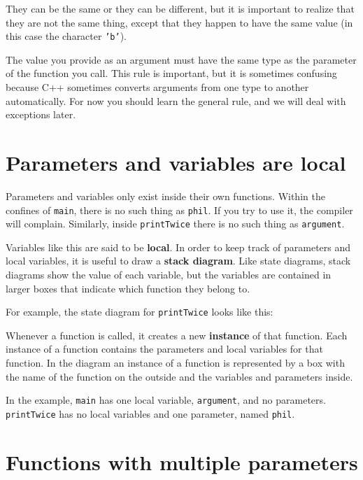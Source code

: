 They can be the same or they can be different, but it is important
to realize that they are not the same thing, except that they happen
to have the same value (in this case the character {\tt 'b'}).

The value you provide as an argument must have the same type as
the parameter of the function you call.  This rule is
important, but it is sometimes confusing because C++ sometimes
converts arguments from one type to another automatically.  For
now you should learn the general rule, and we will deal with
exceptions later.

\section {Parameters and variables are local}

Parameters and
variables only exist inside their own functions.  Within the
confines of {\tt main}, there is no such thing as {\tt phil}.
If you try to use it, the compiler will complain.  Similarly,
inside {\tt printTwice} there is no such thing as {\tt argument}.

Variables like this are said to be {\bf local}.  In order to
keep track of parameters and local variables, it is useful to
draw a {\bf stack diagram}.  Like state diagrams, stack diagrams
show the value of each variable, but the variables are contained
in larger boxes that indicate which function they belong to.

For example, the state diagram for {\tt printTwice} looks 
like this:

\vspace{0.1in}
\centerline{}
\vspace{0.1in}
%
Whenever a function is called, it creates a new {\bf instance}
of that function.  Each instance of a function contains the
parameters and local variables for that function.  In the
diagram an instance of a function is represented by a box
with the name of the function on the outside and the variables
and parameters inside.

In the example, {\tt main} has one local variable, {\tt argument}, and
no parameters.  {\tt printTwice} has no local variables and one
parameter, named {\tt phil}.

\section {Functions with multiple parameters}

